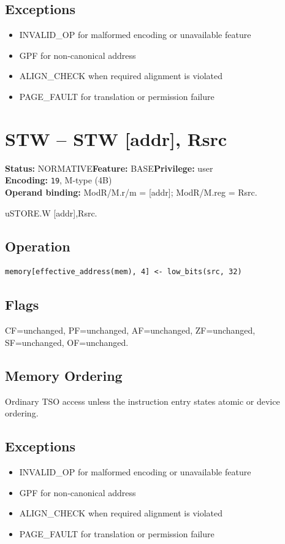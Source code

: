 \documentclass[10pt]{article}
\begin{document}
\subsection*{Exceptions}
\begin{itemize}
\item INVALID\_OP for malformed encoding or unavailable feature
\item GPF for non-canonical address
\item ALIGN\_CHECK when required alignment is violated
\item PAGE\_FAULT for translation or permission failure
\end{itemize}
\clearpage

\section{STW -- STW [addr], Rsrc}
\textbf{Status:} NORMATIVE\quad \textbf{Feature:} BASE\quad \textbf{Privilege:} user\\
\textbf{Encoding:} \texttt{19}, M-type (4B)\\
\textbf{Operand binding:} ModR/M.r/m = [addr]; ModR/M.reg = Rsrc.

uSTORE.W [addr],Rsrc.

\subsection*{Operation}
\begin{lstlisting}
memory[effective_address(mem), 4] <- low_bits(src, 32)
\end{lstlisting}
\subsection*{Flags}
CF=unchanged, PF=unchanged, AF=unchanged, ZF=unchanged, SF=unchanged, OF=unchanged.
\subsection*{Memory Ordering}
Ordinary TSO access unless the instruction entry states atomic or device ordering.
\subsection*{Exceptions}
\begin{itemize}
\item INVALID\_OP for malformed encoding or unavailable feature
\item GPF for non-canonical address
\item ALIGN\_CHECK when required alignment is violated
\item PAGE\_FAULT for translation or permission failure
\end{itemize}
\clearpage
\end{document}
